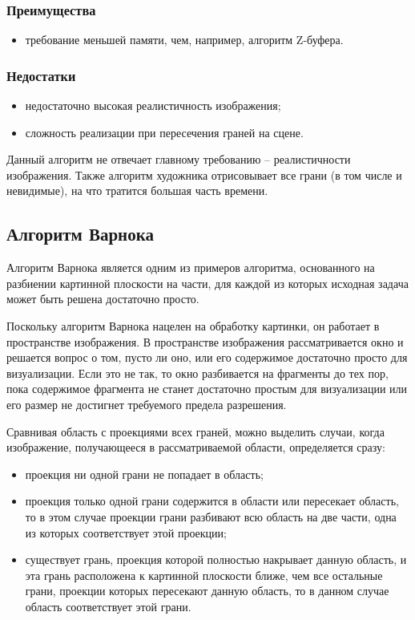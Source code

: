 \subsubsection*{Преимущества}
\begin{itemize}
\item	требование меньшей памяти, чем, например, алгоритм Z-буфера.
\end{itemize}

\subsubsection*{Недостатки}
\begin{itemize}
\item	недостаточно высокая реалистичность изображения;
\item	сложность реализации при пересечения граней на сцене.
\end{itemize}

Данный алгоритм не отвечает главному требованию – реалистичности изображения. Также алгоритм художника отрисовывает все грани (в том числе и невидимые), на что тратится большая часть времени.


\subsection{Алгоритм Варнока}

 Алгоритм Варнока \cite{varnok} является одним из примеров алгоритма, основанного на разбиении картинной плоскости на части, для каждой из которых исходная задача может быть решена достаточно просто.
 
 Поскольку алгоритм Варнока нацелен на обработку картинки, он работает в пространстве изображения. В пространстве изображения рассматривается окно и решается вопрос о том, пусто ли оно, или его содержимое достаточно просто для визуализации. Если это не так, то окно разбивается на фрагменты до тех пор, пока содержимое фрагмента не станет достаточно простым для визуализации или его размер не достигнет требуемого предела разрешения.
 
 Сравнивая область с проекциями всех граней, можно выделить случаи, когда изображение, получающееся в рассматриваемой области, определяется сразу:
 
\begin{itemize}
 \item	проекция ни одной грани не попадает в область;
\item	проекция только одной грани содержится в области или пересекает область, то в этом случае проекции грани разбивают всю область на две части, одна из которых соответствует этой проекции;
\item	существует грань, проекция которой полностью накрывает данную область, и эта грань расположена к картинной плоскости ближе, чем все остальные грани, проекции которых пересекают данную область, то в данном случае область соответствует этой грани.
\end{itemize}
 
